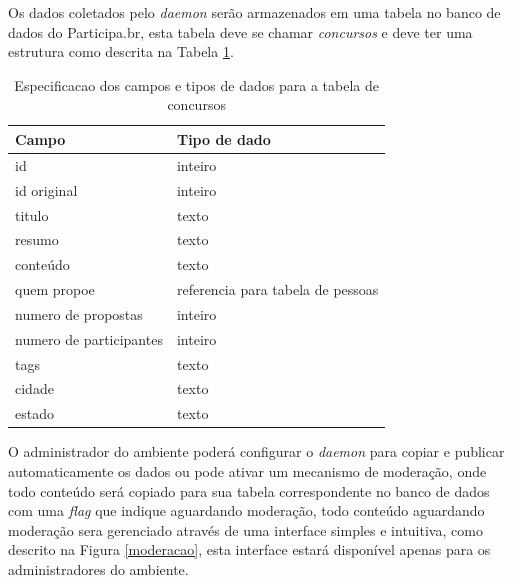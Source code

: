 \documentclass[12pt]{article}
\begin{document}
Os dados coletados pelo {\it daemon} serão armazenados em uma tabela no banco
de dados do Participa.br, esta tabela deve se chamar {\it concursos} e deve
ter uma estrutura como descrita na Tabela \ref{dados}.

\begin{table}[t]
\centering
\begin{tabular}{|l|l|}
  \hline
  Campo                   & Tipo de dado \\
  \hline
  id                      & inteiro \\
  id original             & inteiro \\
  titulo                  & texto \\
  resumo                  & texto \\
  conteúdo                & texto \\
  quem propoe             & referencia para tabela de pessoas \\
  numero de propostas     & inteiro \\
  numero de participantes & inteiro \\
  tags                    & texto \\
  cidade                  & texto \\
  estado                  & texto \\
  \hline
\end{tabular}
\caption{Especificacao dos campos e tipos de dados para a tabela de concursos}
\label{dados}
\end{table}

O administrador do ambiente poderá configurar o {\it daemon} para copiar e
publicar automaticamente os dados ou pode ativar um mecanismo de moderação,
onde todo conteúdo será copiado para sua tabela correspondente no
banco de dados com uma {\it flag} que indique aguardando moderação, todo conteúdo
aguardando moderação sera gerenciado através de uma interface simples e
intuitiva, como descrito na Figura \ref{moderacao}, esta interface estará
disponível apenas para os administradores do ambiente.
\end{document}
